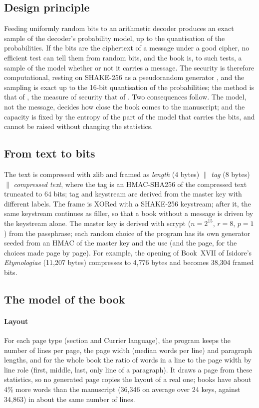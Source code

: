\subsection{Design principle}

Feeding uniformly random bits to an arithmetic decoder produces an exact sample of the decoder's probability model, up to
the quantisation of the probabilities. If the bits are the ciphertext of a message under a good cipher, no efficient test
can tell them from random bits, and the book is, to such tests, a sample of the model whether or not it carries a
message. The security is therefore computational, resting on SHAKE-256 as a pseudorandom generator
\citep{hopper2002}, and the sampling is exact up to the 16-bit quantisation of the probabilities; the method is that of
\citet{ziegler2019}, the measure of security that of \citet{cachin1998}. Two consequences follow.
The model, not the message, decides how close the book comes to the manuscript; and the capacity is fixed by the entropy
of the part of the model that carries the bits, and cannot be raised without changing the statistics.

\subsection{From text to bits}

The text is compressed with zlib and framed as \emph{length} (4 bytes) $\|$ \emph{tag} (8 bytes) $\|$
\emph{compressed text}, where the tag is an HMAC-SHA256 of the compressed text truncated to 64 bits; tag
and keystream are derived from the master key with different labels. The frame is XORed with a SHAKE-256 keystream; after
it, the same keystream continues as filler, so that a book without a message is driven by the keystream alone. The
master key is derived with scrypt ($n = 2^{15}$, $r = 8$, $p = 1$) from the passphrase; each random choice of the
program has its own generator seeded from an HMAC of the master key and the use (and the page, for the choices made
page by page). For example, the opening of
Book~XVII of Isidore's \emph{Etymologiae} (11{,}207 bytes) compresses to 4{,}776 bytes and becomes 38{,}304 framed bits.

\subsection{The model of the book}

\paragraph{Layout} For each page type (section and Currier language), the program keeps the number of lines per page, the
page width (median words per line) and paragraph lengths, and for the whole book the ratio of words in a line to the
page width by line role (first, middle, last, only line of a paragraph). It draws a page from these statistics, so no
generated page copies the layout of a real one; books have about 4\% more words than the manuscript (36{,}346 on average
over 24 keys, against 34{,}863) in about the same number of lines.

